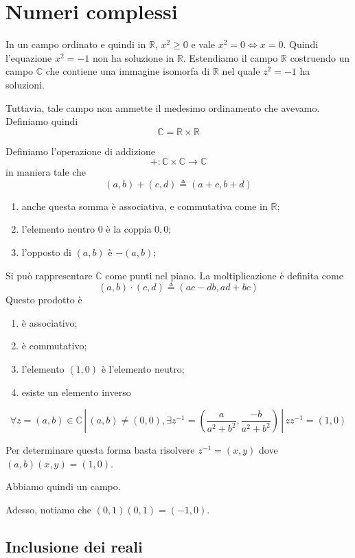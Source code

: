 \documentclass[a4paper]{article}
\begin{document}
\pagebreak

\section{Numeri complessi}

In un campo ordinato e quindi in \(\mathbb{R}\), \(x^2 \geq 0\) e vale \(x^2 = 0 \iff x=0\).
Quindi l'equazione \(x^2 = -1\) non ha soluzione in \(\mathbb{R}\).
Estendiamo il campo \(\mathbb{R}\) costruendo un campo \(\mathbb{C}\)
che contiene una immagine isomorfa di \(\mathbb{R}\) nel quale \(z^2 = -1\)
ha soluzioni.

Tuttavia, tale campo non ammette il medesimo ordinamento che avevamo.
Definiamo quindi
\[
    \mathbb{C} = \mathbb{R} \times \mathbb{R}
\]

Definiamo l'operazione di addizione
\[
    +\colon \mathbb{C} \times \mathbb{C} \to \mathbb{C}
\]
in maniera tale che
\[
    (a,b) + (c,d) \triangleq (a+c, b+d)
\]

\begin{enumerate}
    \item anche questa somma è associativa, e commutativa come in \(\mathbb{R}\);
    \item l'elemento neutro \(0\) è la coppia \(0,0\);
    \item l'opposto di \((a,b)\) è \(-(a,b)\);
\end{enumerate}

Si può rappresentare \(\mathbb{C}\) come punti nel piano.
La moltiplicazione è definita come
\[
    (a,b) \cdot (c,d) \triangleq (ac-db,ad+bc)
\]
Questo prodotto è
\begin{enumerate}
    \item è associativo;
    \item è commutativo;
    \item l'elemento \((1,0)\) è l'elemento neutro;
    \item esiste un elemento inverso
\end{enumerate}

\[
    \forall z=(a,b) \in \mathbb{C} \,|\, (a,b) \neq (0,0),
    \exists z^{-1} = \left(\frac{a}{a^2 + b^2}, \frac{-b}{a^2 + b^2}\right) \,|\,
    zz^{-1} = (1,0)
\]

Per determinare questa forma basta risolvere \(z^{-1} = (x,y)\) dove \((a,b)(x,y) = (1,0)\).

Abbiamo quindi un campo.

Adesso, notiamo che \((0,1)(0,1) = (-1, 0)\).

\subsection{Inclusione dei reali}
\end{document}
